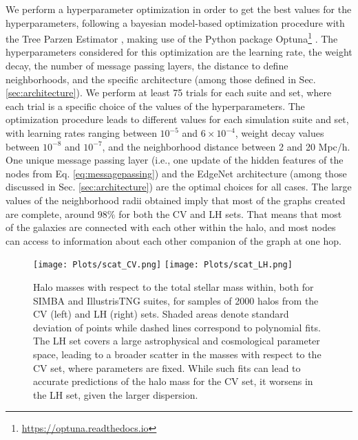 \documentclass[twocolumn]{aastex631}
\begin{document}
We perform a hyperparameter optimization in order to get the best values for the hyperparameters, following a bayesian model-based optimization procedure with the Tree Parzen Estimator \citep[TPE,][]{NIPS2011_86e8f7ab}, making use of the Python package Optuna\footnote{\url{https://optuna.readthedocs.io}} \citep{2019arXiv190710902A}. The hyperparameters considered for this optimization are the learning rate, the weight decay, the number of message passing layers, the distance to define neighborhoods, and the specific architecture (among those defined in Sec. \ref{sec:architecture}). We perform at least 75 trials for each suite and set, where each trial is a specific choice of the values of the hyperparameters. The optimization procedure leads to different values for each simulation suite and set, with learning rates ranging between $10^{-5}$ and $6 \times 10^{-4}$, weight decay values between $10^{-8}$ and $10^{-7}$, and the neighborhood distance  between 2 and 20 Mpc/h. One unique message passing layer (i.e., one update of the hidden features of the nodes from Eq. \ref{eq:messagepassing}) and the EdgeNet architecture (among those discussed in Sec. \ref{sec:architecture}) are the optimal choices for all cases. The large values of the neighborhood radii obtained imply that most of the graphs created are complete, around 98\% for both the CV and LH sets. That means that most of the galaxies are connected with each other within the halo, and most nodes can access to information about each other companion of the graph at one hop. 

\begin{figure*}[ht!]
\begin{center}
\texttt{[image: Plots/scat\_CV.png]}
\texttt{[image: Plots/scat\_LH.png]}
\caption{Halo masses with respect to the total stellar mass within, both for SIMBA and IllustrisTNG suites, for samples of 2000 halos from the CV (left) and LH (right) sets. Shaded areas denote standard deviation of points while dashed lines correspond to polynomial fits. The LH set covers a large astrophysical and cosmological parameter space, leading to a broader scatter in the masses with respect to the CV set, where parameters are fixed. While such fits can lead to accurate predictions of the halo mass for the CV set, it worsens in the LH set, given the larger dispersion.}
\label{fig:scatplot}
\end{center}
\end{figure*}
\end{document}
